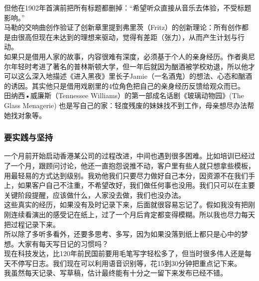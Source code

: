 但他在1902年首演前把所有标题都删掉：``希望听众直接从音乐去体验，不受标题影响。''\\
马勒的交响曲创作验证了创新章里提到弗里茨（Fritz）的创新理论：所有创作都是由很高但现在未达到的理想来驱动，觉得有差距（张力），从而产生计划与行动。\\
如果只是借用人家的故事，内容很难有深度，必须基于个人的亲身经历。作者奥尼尔年轻时考进了著名的普林斯顿大学，但一年后就因为酗酒被学校劝退，所以他才可以这么深入地描述《进入黑夜》里长子Jamie（一名酒鬼）的想法、心态和酗酒的诱因。其实他只是借用戏剧里的4位角色把自己的亲身经历反馈给观众而已。\\
田纳西•威廉斯（Tennessee Williams）的第一部成名话剧《玻璃动物园》(The
Glass Menagerie)
也是写自己的家：轻度残废的妹妹找不到工作，母亲想尽办法帮她找对象等。

\hypertarget{ux8981ux5b9eux8df5ux4e0eux575aux6301}{%
\subsubsection{要实践与坚持}\label{ux8981ux5b9eux8df5ux4e0eux575aux6301}}

一个月前开始启动香港某公司的过程改进，中间也遇到很多困难。比如培训已经过了一个月，跟顾问讨论，他还一直抱怨说推不动，客户里有些人就只想拿些模板，用最轻易的方式达到级别。我劝他我们只要尽力做好自己本分，因资源不在我们手上，如果客户自己不注重，不希望改好，我们做任何事也没用。我们只可以在主要关键阶段提醒，应该做什么，人家没去做，我们也没办法。\\
这些真实的经历，如果没有及时记录下来，后面就很容易忘记了。假如我没有把刚刚连续看演出的感受记在纸上，过了一个月后肯定都变得模糊。所以我也尽力每天把过程记录下来。\\
所以除了多听多看外，还要多思考、多写，因为如果没落到纸上都只是心中的梦想。大家有每天写日记的习惯吗？\\
现在科技发达，比120年前民国前要用毛笔写字轻松多了，但当时很多伟人还是每天不停写日志。我们现在可以利用语音识别等，花15到30分钟把重点记下来。\\
我虽然每天记录、写草稿，估计最终能有十分之一留下来发布已经不错。


